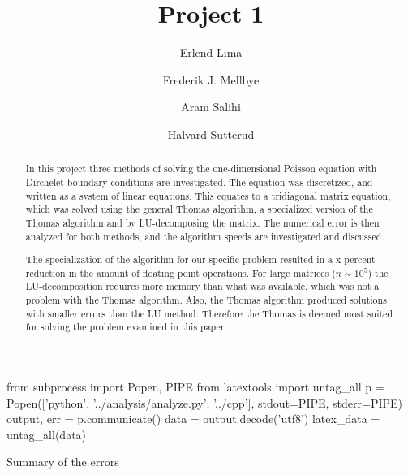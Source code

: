 \documentclass[a4paper,11pt, english, twoside]{article}
\title{Project 1}
\begin{document}
\author[1]{Erlend Lima}
\author[2]{Frederik J. Mellbye}
\author[3]{Aram Salihi}
\author[4]{Halvard Sutterud}
\maketitle

\begin{abstract}
  In this project three methods of solving the one-dimensional Poisson equation with
  Dirchelet boundary conditions are investigated. The equation was discretized,
  and written as a system of linear equations. This equates to
  a tridiagonal matrix equation, which was solved using the general Thomas algorithm,
  a specialized version of the Thomas algorithm and by LU-decomposing the matrix. The
  numerical error is then analyzed for both methods, and the algorithm speeds are investigated and discussed.

  The specialization of the algorithm for our specific problem resulted in
  a x percent reduction in the amount of floating point operations. For large
  matrices ($n \sim 10^5$) the LU-decomposition requires
  more memory than what was available, which was not a problem with the Thomas
  algorithm. Also, the Thomas algorithm produced solutions with smaller errors
  than the LU method. Therefore the Thomas is deemed most suited for solving the problem
  examined in this paper.
\end{abstract}

\begin{pycode}
from subprocess import Popen, PIPE
from latextools import untag_all
p = Popen(['python', '../analysis/analyze.py', '../cpp'],
stdout=PIPE, stderr=PIPE)
output, err = p.communicate()
data = output.decode('utf8')
latex_data = untag_all(data)
\end{pycode}

\begin{table}[ht]
  \centering
  \caption{Summary of the errors}
  \label{tab:error}
\end{table}
\end{document}
